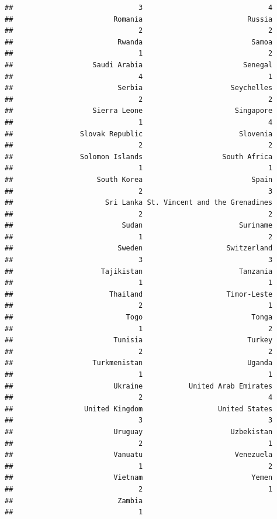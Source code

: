 \documentclass[
]{article}
\begin{document}
\begin{verbatim}
##                              3                              4 
##                        Romania                         Russia 
##                              2                              2 
##                         Rwanda                          Samoa 
##                              1                              2 
##                   Saudi Arabia                        Senegal 
##                              4                              1 
##                         Serbia                     Seychelles 
##                              2                              2 
##                   Sierra Leone                      Singapore 
##                              1                              4 
##                Slovak Republic                       Slovenia 
##                              2                              2 
##                Solomon Islands                   South Africa 
##                              1                              1 
##                    South Korea                          Spain 
##                              2                              3 
##                      Sri Lanka St. Vincent and the Grenadines 
##                              2                              2 
##                          Sudan                       Suriname 
##                              1                              2 
##                         Sweden                    Switzerland 
##                              3                              3 
##                     Tajikistan                       Tanzania 
##                              1                              1 
##                       Thailand                    Timor-Leste 
##                              2                              1 
##                           Togo                          Tonga 
##                              1                              2 
##                        Tunisia                         Turkey 
##                              2                              2 
##                   Turkmenistan                         Uganda 
##                              1                              1 
##                        Ukraine           United Arab Emirates 
##                              2                              4 
##                 United Kingdom                  United States 
##                              3                              3 
##                        Uruguay                     Uzbekistan 
##                              2                              1 
##                        Vanuatu                      Venezuela 
##                              1                              2 
##                        Vietnam                          Yemen 
##                              2                              1 
##                         Zambia 
##                              1
\end{verbatim}
\end{document}
